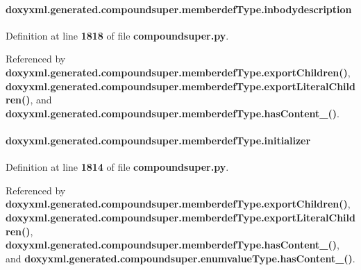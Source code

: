 \paragraph[{inbodydescription}]{\setlength{\rightskip}{0pt plus 5cm}doxyxml.\+generated.\+compoundsuper.\+memberdef\+Type.\+inbodydescription}\label{classdoxyxml_1_1generated_1_1compoundsuper_1_1memberdefType_ad6f56457e0b05f0a644b1223e9ba3f61}


Definition at line {\bf 1818} of file {\bf compoundsuper.\+py}.



Referenced by {\bf doxyxml.\+generated.\+compoundsuper.\+memberdef\+Type.\+export\+Children()}, {\bf doxyxml.\+generated.\+compoundsuper.\+memberdef\+Type.\+export\+Literal\+Children()}, and {\bf doxyxml.\+generated.\+compoundsuper.\+memberdef\+Type.\+has\+Content\+\_\+()}.

\paragraph[{initializer}]{\setlength{\rightskip}{0pt plus 5cm}doxyxml.\+generated.\+compoundsuper.\+memberdef\+Type.\+initializer}\label{classdoxyxml_1_1generated_1_1compoundsuper_1_1memberdefType_a95ad6e5b0c794dac92dda77493158b78}


Definition at line {\bf 1814} of file {\bf compoundsuper.\+py}.



Referenced by {\bf doxyxml.\+generated.\+compoundsuper.\+memberdef\+Type.\+export\+Children()}, {\bf doxyxml.\+generated.\+compoundsuper.\+memberdef\+Type.\+export\+Literal\+Children()}, {\bf doxyxml.\+generated.\+compoundsuper.\+memberdef\+Type.\+has\+Content\+\_\+()}, and {\bf doxyxml.\+generated.\+compoundsuper.\+enumvalue\+Type.\+has\+Content\+\_\+()}.


